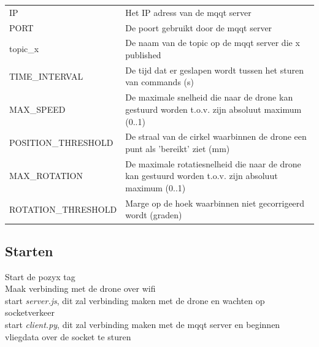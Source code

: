 \begin{tabular}{ l | l }
IP & Het IP adress van de mqqt server\\
PORT & De poort gebruikt door de mqqt server\\
topic\_x & De naam van de topic op de mqqt server die x published\\
TIME\_INTERVAL & De tijd dat er geslapen wordt tussen het sturen van commands (s)\\
MAX\_SPEED & De maximale snelheid die naar de drone kan gestuurd worden t.o.v. zijn absoluut maximum (0..1)\\
POSITION\_THRESHOLD & De straal van de cirkel waarbinnen de drone een punt als 'bereikt' ziet (mm)\\
MAX\_ROTATION & De maximale rotatiesnelheid die naar de drone kan gestuurd worden t.o.v. zijn absoluut maximum (0..1)\\
ROTATION\_THRESHOLD & Marge op de hoek waarbinnen niet gecorrigeerd wordt (graden)\\
\end{tabular}




\subsection{Starten}


Start de pozyx tag\\
Maak verbinding met de drone over wifi\\
start \textit{server.js}, dit zal verbinding maken met de drone en wachten op socketverkeer\\
start \textit{client.py}, dit zal verbinding maken met de mqqt server en beginnen vliegdata over de socket te sturen\\
